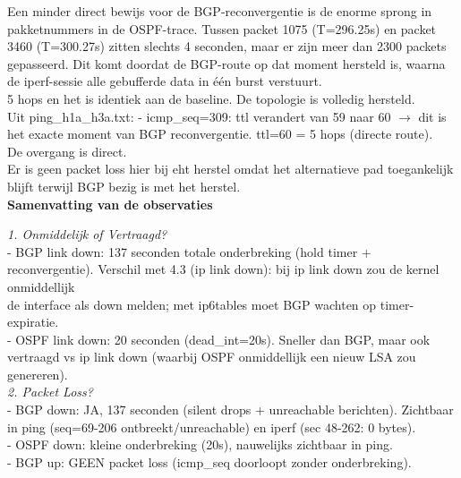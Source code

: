 Een minder direct bewijs voor de BGP-reconvergentie is de enorme sprong in pakketnummers in de OSPF-trace. Tussen packet 1075 (T=296.25s) en packet 3460 (T=300.27s) zitten slechts 4 seconden, maar er zijn meer dan 2300 packets gepasseerd. Dit komt doordat de BGP-route op dat moment hersteld is, waarna de iperf-sessie alle gebufferde data in één burst verstuurt.\\

5 hops en het is identiek aan de baseline. De topologie is volledig hersteld.\\

Uit ping\_h1a\_h3a.txt:
  - icmp\_seq=309: ttl verandert van 59 naar 60 $\rightarrow$ dit is het exacte moment van BGP reconvergentie.
    ttl=60 = 5 hops (directe route).\\
    De overgang is direct.\\

Er is geen packet loss hier bij eht herstel omdat het alternatieve pad toegankelijk blijft terwijl BGP bezig is met het herstel. \\

\textbf{Samenvatting van de observaties}

\textit{1. Onmiddelijk of Vertraagd?}\\

   - BGP link down: 137 seconden totale onderbreking (hold timer + reconvergentie).
     Verschil met 4.3 (ip link down): bij ip link down zou de kernel onmiddellijk\\
     de interface als down melden; met ip6tables moet BGP wachten op timer-expiratie.\\
   - OSPF link down: 20 seconden (dead\_int=20s). Sneller dan BGP, maar ook vertraagd
     vs ip link down (waarbij OSPF onmiddellijk een nieuw LSA zou genereren).\\
 
\textit{2. Packet Loss?}\\

   - BGP down: JA, 137 seconden (silent drops + unreachable berichten).
     Zichtbaar in ping (seq=69-206 ontbreekt/unreachable) en iperf (sec 48-262: 0 bytes).\\
     
   - OSPF down: kleine onderbreking (20s), nauwelijks zichtbaar in ping.\\
   
   - BGP up: GEEN packet loss (icmp\_seq doorloopt zonder onderbreking).\\
   
